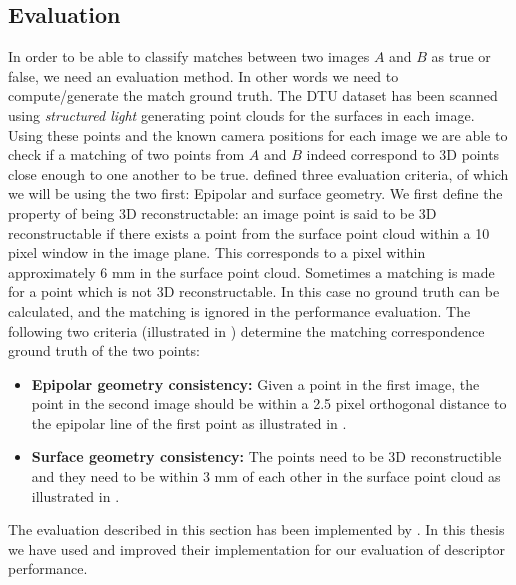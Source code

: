 \documentclass[thesis.tex]{subfiles}
\begin{document}
\subsection{Evaluation}
In order to be able to classify matches between two images $A$ and $B$ as true or false, we need an evaluation method. In other words we need to compute/generate the match ground truth. The DTU dataset has been scanned using \emph{structured light} generating point clouds for the surfaces in each image. Using these points and the known camera positions for each image we are able to check if a matching of two points from $A$ and $B$ indeed correspond to 3D points close enough to one another to be true. \citet{aanaes2010recall} defined three evaluation criteria, of which we will be using the two first: Epipolar and surface geometry. We first define the property of being 3D reconstructable: an image point is said to be 3D reconstructable if there exists a point from the surface point cloud within a 10 pixel window in the image plane. This corresponds to a pixel within approximately 6 mm in the surface point cloud. Sometimes a matching is made for a point which is not 3D reconstructable. In this case no ground truth can be calculated, and the matching is ignored in the performance evaluation. The following two criteria (illustrated in ) determine the matching correspondence ground truth of the two points:
\begin{itemize}
	\item \textbf{Epipolar geometry consistency:} Given a point in the first image, the point in the second image should be within a 2.5 pixel orthogonal distance to the epipolar line of the first point as illustrated in .
	\item \textbf{Surface geometry consistency:} The points need to be 3D reconstructible and they need to be within 3 mm of each other in the surface point cloud as illustrated in .
\end{itemize}
The evaluation described in this section has been implemented by \citet{aanaes2010recall}. In this thesis we have used and improved their implementation for our evaluation of descriptor performance.

\end{document}
